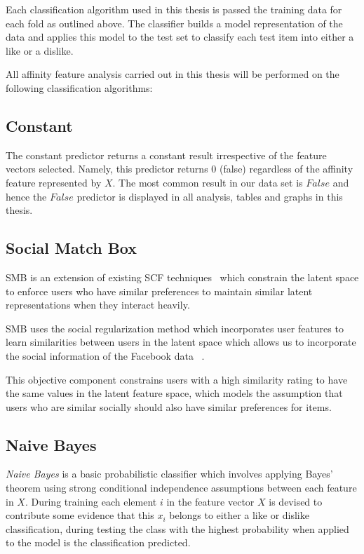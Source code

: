 Each classification algorithm used in this thesis is passed the training data for each fold as outlined above. The classifier 
builds a model representation of the data and applies this model to the test set to classify each test item into either a like or 
a dislike.

All affinity feature analysis carried out in this thesis will be performed on the following classification algorithms:

\subsection{Constant}
\label{sec:const}

The constant predictor returns a constant result irrespective of the feature vectors selected. Namely, this predictor returns $0$ (false)
regardless of the affinity feature represented by $X$. The most common result in our data set is $False$ and hence the $False$ 
predictor is displayed in all analysis, tables and graphs in this thesis.

\subsection{Social Match Box}
\label{sec:sr}

SMB is an extension of existing SCF techniques~\cite{lla,socinf} which constrain the latent space to enforce users 
who have similar preferences to maintain similar latent representations when they interact heavily.

SMB uses the social regularization method which incorporates user features to learn
similarities between users in the latent space which allows us to incorporate the social information of the Facebook data ~\cite{joseph}.

This objective component constrains users with a high similarity rating to have the same values in the latent feature space, which
models the assumption that users who are similar socially should also have similar preferences for items.

\subsection{Naive Bayes}
\label{sec:nb}

\emph{Naive Bayes} is a basic probabilistic classifier which involves applying Bayes' theorem using strong conditional independence 
assumptions between each feature in $X$. During training each element $i$ in the feature vector $X$ is devised to contribute some 
evidence that this $x_i$ belongs to either a like or dislike classification, during testing the class with the highest probability 
when applied to the model is the classification predicted. 

